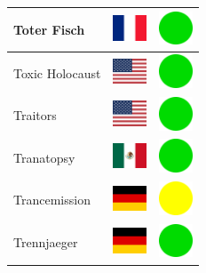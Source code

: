 \documentclass[12pt, a4paper, twoside]{report}
\begin{document}
\begin{center}
\begin{longtable}{|p{5cm}|p{2cm}|p{2cm}|}
 Toter Fisch                                                & \includegraphics[width=1cm]{../4x3/fr} &   \includegraphics[width=1cm]{../likes/y} \\ \hline
 Toxic Holocaust                                            & \includegraphics[width=1cm]{../4x3/us} &   \includegraphics[width=1cm]{../likes/y} \\ \hline
 Traitors                                                   & \includegraphics[width=1cm]{../4x3/us} &   \includegraphics[width=1cm]{../likes/y} \\ \hline
 Tranatopsy                                                 & \includegraphics[width=1cm]{../4x3/mx} &   \includegraphics[width=1cm]{../likes/y} \\ \hline
 Trancemission                                              & \includegraphics[width=1cm]{../4x3/de} &   \includegraphics[width=1cm]{../likes/m} \\ \hline
 Trennjaeger                                                & \includegraphics[width=1cm]{../4x3/de} &   \includegraphics[width=1cm]{../likes/y} \\ \hline

\end{longtable}
\end{center}
\end{document}
